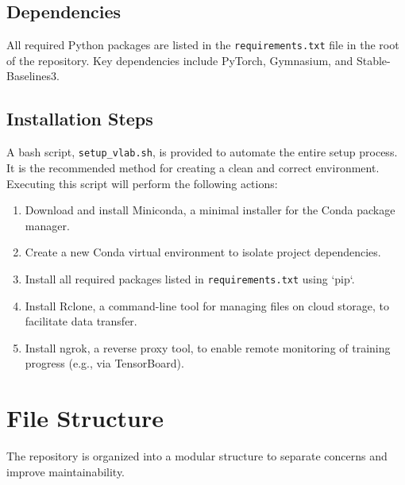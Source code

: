 \subsection{Dependencies}
All required Python packages are listed in the \texttt{requirements.txt} file in the root of the repository. Key dependencies include PyTorch, Gymnasium, and Stable-Baselines3.

\subsection{Installation Steps}
A bash script, \texttt{setup\_vlab.sh}, is provided to automate the entire setup process. It is the recommended method for creating a clean and correct environment. Executing this script will perform the following actions:
\begin{enumerate}
    \item Download and install Miniconda, a minimal installer for the Conda package manager.
    \item Create a new Conda virtual environment to isolate project dependencies.
    \item Install all required packages listed in \texttt{requirements.txt} using `pip`.
    \item Install Rclone, a command-line tool for managing files on cloud storage, to facilitate data transfer.
    \item Install ngrok, a reverse proxy tool, to enable remote monitoring of training progress (e.g., via TensorBoard).
\end{enumerate}

\section{File Structure}
The repository is organized into a modular structure to separate concerns and improve maintainability.

